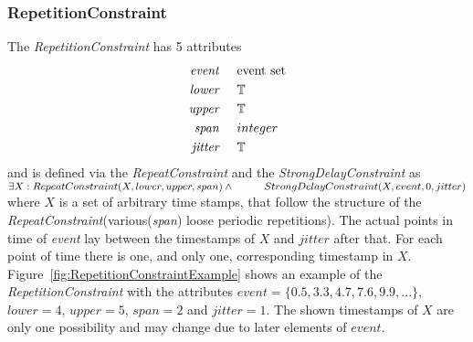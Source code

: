 	\subsubsection{RepetitionConstraint}
		The \emph{RepetitionConstraint} has 5 attributes
		\begin{align*}
			\emph{event} & \hspace{.5cm}\text{event set}\\
			\emph{lower} & \hspace{.5cm}\text{$\mathbb{T}$}\\
			\emph{upper} & \hspace{.5cm}\text{$\mathbb{T}$}\\
			\emph{span}	 & \hspace{.5cm}\text{$integer$}\\
			\emph{jitter}& \hspace{.5cm}\mathbb{T}
		\end{align*}
		and is defined via the \emph{RepeatConstraint} and the \emph{StrongDelayConstraint} as\\[10pt]
		\begin{math}
			\exists X: RepeatConstraint(X, lower, upper, span) \land \\
			\text{\hspace{1cm}}StrongDelayConstraint(X, event, 0, jitter)
		\end{math}\\[10pt]
		where $X$ is a set of arbitrary time stamps, that follow the structure of the \emph{RepeatConstraint}(various(\emph{span}) loose periodic repetitions). The actual points in time of \emph{event} lay between the timestamps of $X$ and $jitter$ after that. For each point of time there is one, and only one, corresponding timestamp in $X$.
		Figure~\ref{fig:RepetitionConstraintExample} shows an example of the \emph{RepetitionConstraint} with the attributes $event=\{0.5, 3.3, 4.7, 7.6, 9.9, ...\}$, $lower=4$, $upper=5$, $span=2$ and $jitter=1$. The shown timestamps of $X$ are only one possibility and may change due to later elements of $event$.
		
